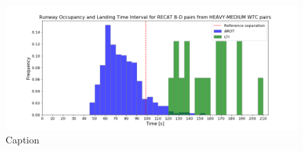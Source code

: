 \begin{figure}[h]
    \centering
    \includegraphics[width=1\textwidth]{graphics/fig_BD_from_HM_pairs_time_sep.png}
    \caption[list of figures caption]{Caption}
    \label{fig:BD_from_HM_pairs_time_sep}
\end{figure}








